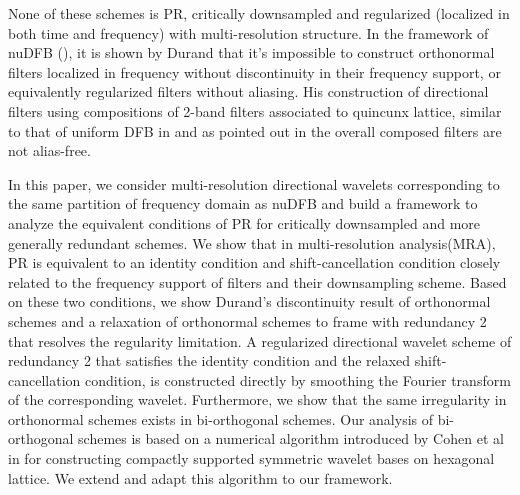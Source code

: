 None of these schemes is PR, critically downsampled and regularized (localized in both time and frequency) with multi-resolution structure. 
In the framework of nuDFB (\cite{nuDFB05}), it is shown by Durand \cite{durand2007} that it's impossible to construct orthonormal filters localized in frequency without discontinuity in their frequency support, or equivalently regularized filters without aliasing. His construction of directional filters using compositions of 2-band filters associated to quincunx lattice, similar to that of uniform DFB in \cite{nuDFB05} and as pointed out in \cite{nuDFB05} the overall composed filters are not alias-free.

In this paper, we consider multi-resolution directional wavelets corresponding to the same partition of frequency domain as nuDFB and build a framework to analyze the equivalent conditions of PR for critically downsampled and more generally redundant schemes. We show that in multi-resolution analysis(MRA), PR is equivalent to an identity condition and shift-cancellation condition closely related to the frequency support of filters and their downsampling scheme. Based on these two conditions, we show Durand's discontinuity result of orthonormal schemes and a relaxation of orthonormal schemes to frame with redundancy 2 that resolves the regularity limitation. A regularized directional wavelet scheme of redundancy 2 that satisfies the identity condition and the relaxed shift-cancellation condition, is constructed directly by smoothing the Fourier transform of the corresponding wavelet.
Furthermore, we show that the same irregularity in orthonormal schemes exists in bi-orthogonal schemes. Our analysis of bi-orthogonal schemes is based on a numerical algorithm introduced by Cohen et al in \cite{cohen1993compactly} for constructing compactly supported symmetric wavelet bases on hexagonal lattice. We extend and adapt this algorithm to our framework.

